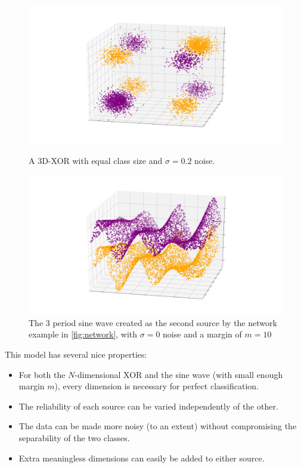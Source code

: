 \documentclass{article}
\begin{document}
\begin{figure}
\begin{minipage}{.5\textwidth}
    \centering
    \includegraphics[width=\textwidth]{xor_3d_square.png}
    \caption{A 3D-XOR with equal class size and $\sigma=0.2$ noise.}
    \label{fig:xor}
\end{minipage}
\begin{minipage}{.5\textwidth}
    \centering
    \includegraphics[width=\textwidth]{sine_wave_square.png}
    \caption{The 3 period sine wave created as the second source by the network
        example in \ref{fig:network}, with $\sigma=0$ noise and a margin of
        $m=10$}
    \label{fig:sine_wave}
\end{minipage}
\end{figure}

This model has several nice properties:
\begin{itemize}
    \item For both the $N$-dimensional XOR and the sine wave (with small enough
        margin $m$), every dimension is necessary for perfect classification.
    \item The reliability of each source can be varied independently of the
        other.
    \item The data can be made more noisy (to an extent) without
        compromising the separability of the two classes.
    \item Extra meaningless dimensions can easily be added to either source.
\end{itemize}
\end{document}
